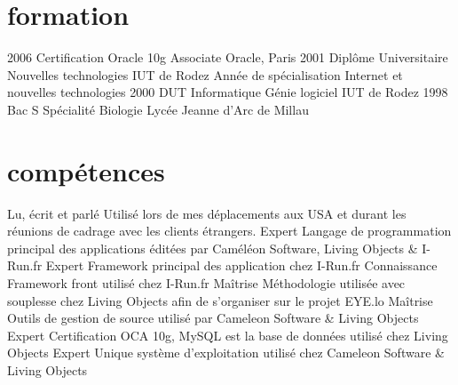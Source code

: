 \documentclass{friggeri-cv} 	%
\begin{document}

\section{formation}

\begin{entrylist}
\entry
{2006}
{Certification Oracle {\normalfont 10g Associate}}
{Oracle, Paris}
{}
\entry
{2001}
{Diplôme Universitaire {\normalfont Nouvelles technologies}}
{IUT de Rodez}
{Année de spécialisation Internet et nouvelles technologies}
\entry
{2000}
{DUT {\normalfont Informatique Génie logiciel}}
{IUT de Rodez}
{}
\entry
{1998}
{Bac S {\normalfont Spécialité Biologie}}
{Lycée Jeanne d’Arc de Millau}
{}
\end{entrylist}


\section{compétences}

\begin{capabilitize}
		{Lu, écrit et parlé}
		{Utilisé lors de mes déplacements aux USA et durant les réunions de cadrage avec les clients
		étrangers.}
		{Expert}
		{Langage de programmation principal des applications éditées par Caméléon Software, Living Objects \& I-Run.fr}
		{Expert}
		{Framework principal des application chez I-Run.fr}
		{Connaissance}
		{Framework front utilisé chez I-Run.fr}
		{Maîtrise}
		{Méthodologie utilisée avec souplesse chez Living Objects afin de s’organiser sur le projet EYE.lo}
		{Maîtrise}
		{Outils de gestion de source utilisé par Cameleon Software \& Living Objects}
		{Expert}
		{Certification OCA 10g, MySQL est la base de données utilisé chez Living Objects}
		{Expert}
		{Unique système d’exploitation utilisé chez Cameleon Software \& Living Objects}
\end{capabilitize}
\end{document}

